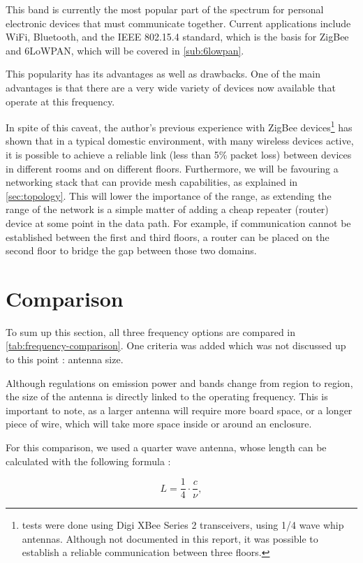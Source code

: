 This band is currently the most popular part of the spectrum for personal
electronic devices that must communicate together. Current applications include
WiFi, Bluetooth, and the IEEE 802.15.4 standard, which is the basis for ZigBee
and \ac{6LoWPAN}, which will be covered in \autoref{sub:6lowpan}.

This popularity has its advantages as well as drawbacks. One of the main
advantages is that there are a very wide variety of devices now available that
operate at this frequency. 

In spite of this caveat, the author's previous experience with ZigBee
devices\footnote{tests were done using Digi XBee Series 2 transceivers, using
1/4 wave whip antennas. Although not documented in this report, it was possible
to establish a reliable communication between three floors.}
has shown that in a typical domestic environment, with many wireless devices
active, it is possible to achieve a reliable link (less than 5\% packet loss)
between devices in different
rooms and on different floors. Furthermore, we will be favouring a networking
stack that can provide mesh capabilities, as explained in
\autoref{sec:topology}. This will lower the importance of the range, as
extending the range of the network is a simple matter of adding a cheap repeater
(router) device at some point in the data path. For example, if communication
cannot be established between the first and third floors, a router can be placed
on the second floor to bridge the gap between those two domains.


\section{Comparison}

To sum up this section, all three frequency options are compared in
\autoref{tab:frequency-comparison}. One criteria was added which was not
discussed up to this point : antenna size.

Although regulations on emission power and bands change from region to region,
the size of the antenna is directly linked to the operating frequency. This is
important to note, as a larger antenna will require more board space, or
a longer piece of wire, which will take more space inside or around an
enclosure.

For this comparison, we used a quarter wave antenna, whose length can be
calculated with the following formula :

\begin{equation*}
  L = \frac{1}{4} \cdot \frac{c}{\nu},
\end{equation*}

